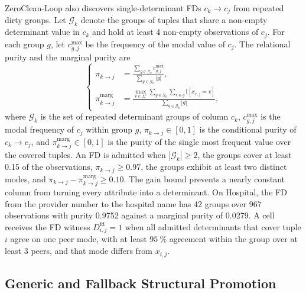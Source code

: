 \documentclass[conference]{IEEEtran}
\begin{document}
ZeroClean-Loop also discovers single-determinant FDs $c_k \to c_j$ from repeated dirty groups. Let $\mathcal{G}_k$ denote the groups of tuples that share a non-empty determinant value in $c_k$ and hold at least 4 non-empty observations of $c_j$. For each group $g$, let $c_{g,j}^{\max}$ be the frequency of the modal value of $c_j$. The relational purity and the marginal purity are
\begin{equation}
\label{eq:fd_purity}
\left\{
\begin{aligned}
\pi_{k \to j} &= \frac{\sum_{g \in \mathcal{G}_k} c_{g,j}^{\max}}{\sum_{g \in \mathcal{G}_k} |g|}, \\
\pi_{k \to j}^{\mathrm{marg}} &= \frac{\max_{v \in \Sigma^{\star}} \sum_{g \in \mathcal{G}_k} \sum_{r \in g} \mathbb{I}[x_{r,j} = v]}{\sum_{g \in \mathcal{G}_k} |g|},
\end{aligned}
\right.
\end{equation}
where $\mathcal{G}_k$ is the set of repeated determinant groups of column $c_k$, $c_{g,j}^{\max}$ is the modal frequency of $c_j$ within group $g$, $\pi_{k \to j} \in [0,1]$ is the conditional purity of $c_k \to c_j$, and $\pi_{k \to j}^{\mathrm{marg}} \in [0,1]$ is the purity of the single most frequent value over the covered tuples. An FD is admitted when $|\mathcal{G}_k| \ge 2$, the groups cover at least 0.15 of the observations, $\pi_{k \to j} \ge 0.97$, the groups exhibit at least two distinct modes, and $\pi_{k \to j} - \pi_{k \to j}^{\mathrm{marg}} \ge 0.10$. The gain bound prevents a nearly constant column from turning every attribute into a determinant. On Hospital, the FD from the provider number to the hospital name has 42 groups over 967 observations with purity 0.9752 against a marginal purity of 0.0279. A cell receives the FD witness $D_{i,j}^{\mathrm{fd}} = 1$ when all admitted determinants that cover tuple $i$ agree on one peer mode, with at least $95~\%$ agreement within the group over at least 3 peers, and that mode differs from $x_{i,j}$.

\subsection{Generic and Fallback Structural Promotion}
\label{subsec:det_structural}
\end{document}
